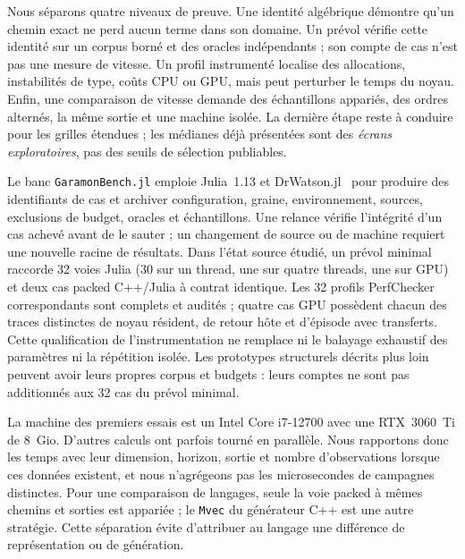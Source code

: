 \documentclass[11pt,a4paper]{article}
\newcommand{\code}[1]{\texttt{#1}}
\begin{document}
Nous séparons quatre niveaux de preuve. Une identité algébrique démontre
qu'un chemin exact ne perd aucun terme dans son domaine. Un prévol
vérifie cette identité sur un corpus borné et des oracles indépendants ;
son compte de cas n'est pas une mesure de vitesse. Un profil instrumenté
localise des allocations, instabilités de type, coûts CPU ou GPU, mais
peut perturber le temps du noyau. Enfin, une comparaison de vitesse
demande des échantillons appariés, des ordres alternés, la même sortie et
une machine isolée. La dernière étape reste à conduire pour les grilles
étendues ; les médianes déjà présentées sont des \emph{écrans
exploratoires}, pas des seuils de sélection publiables.

Le banc \code{GaramonBench.jl} emploie Julia~1.13 et
DrWatson.jl~\cite{drwatson} pour produire des identifiants de cas et
archiver configuration, graine, environnement, sources, exclusions de
budget, oracles et échantillons. Une relance vérifie l'intégrité d'un
cas achevé avant de le sauter ; un changement de source ou de machine
requiert une nouvelle racine de résultats. Dans l'état source étudié,
un prévol minimal raccorde 32 voies Julia (30 sur un thread, une sur
quatre threads, une sur GPU) et deux cas packed C++/Julia à contrat
identique. Les 32 profils PerfChecker correspondants sont complets et
audités ; quatre cas GPU possèdent chacun des traces distinctes de
noyau résident, de retour hôte et d'épisode avec transferts. Cette
qualification de l'instrumentation ne remplace ni le balayage exhaustif
des paramètres ni la répétition isolée. Les prototypes structurels
décrits plus loin peuvent avoir leurs propres corpus et budgets : leurs
comptes ne sont pas additionnés aux 32 cas du prévol minimal.

La machine des premiers essais est un Intel Core i7-12700 avec une
RTX~3060~Ti de 8~Gio. D'autres calculs ont parfois tourné en parallèle.
Nous rapportons donc les temps avec leur dimension, horizon, sortie et
nombre d'observations lorsque ces données existent, et nous n'agrégeons
pas les microsecondes de campagnes distinctes. Pour une comparaison
de langages, seule la voie packed à mêmes chemins et sorties est
appariée ; le \code{Mvec} du générateur C++ est une autre stratégie.
Cette séparation évite d'attribuer au langage une différence de
représentation ou de génération.
\end{document}
